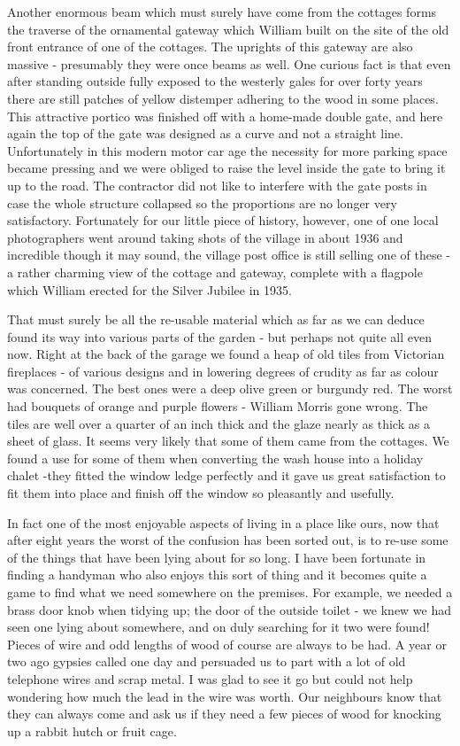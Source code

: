 Another enormous beam which must surely have come from the cottages forms the traverse of the ornamental gateway which William built on the site of the old front entrance of one of the cottages. The uprights of this gateway are also massive - presumably they were once beams as well. One curious fact is that even after standing outside fully exposed to the westerly gales for over forty years there are still patches of yellow distemper adhering to the wood in some places. This attractive portico was finished off with a home-made double gate, and here again the top of the gate was designed as a curve and not a straight line. Unfortunately in this modern motor car age the necessity for more parking space became pressing and we were obliged to raise the level inside the gate to bring it up to the road. The contractor did not like to interfere with the gate posts in case the whole structure collapsed so the proportions are no longer very satisfactory. Fortunately for our little piece of history, however, one of one local photographers went around taking shots of the village in about 1936 and incredible though it may sound, the village post office is still selling one of these - a rather charming view of the cottage and gateway, complete with a flagpole which William erected for the Silver Jubilee in 1935.

That must surely be all the re-usable material which as far as we can deduce found its way into various parts of the garden - but perhaps not quite all even now. Right at the back of the garage we found a heap of old tiles from Victorian fireplaces - of various designs and in lowering degrees of crudity as far as colour was concerned. The best ones were a deep olive green or burgundy red. The worst had bouquets of orange and purple flowers - William Morris gone wrong. The tiles are well over a quarter of an inch thick and the glaze nearly as thick as a sheet of glass. It seems very likely that some of them came from the cottages. We found a use for some of them when converting the wash house into a holiday chalet -they fitted the window ledge perfectly and it gave us great satisfaction to fit them into place and finish off the window so pleasantly and usefully.

In fact one of the most enjoyable aspects of living in a place like ours, now that after eight years the worst of the confusion has been sorted out, is to re-use some of the things that have been lying about for so long. I have been fortunate in finding a handyman who also enjoys this sort of thing and it becomes quite a game to find what we need somewhere on the premises. For example, we needed a brass door knob when tidying up; the door of the outside toilet - we knew we had seen one lying about somewhere, and on duly searching for it two were found! Pieces of wire and odd lengths of wood of course are always to be had. A year or two ago gypsies called one day and persuaded us to part with a lot of old telephone wires and scrap metal. I was glad to see it go but could not help wondering how	much the lead in the wire was worth. Our neighbours know that they can always come and ask us if they need a few pieces of wood for knocking up a rabbit hutch or fruit cage.

